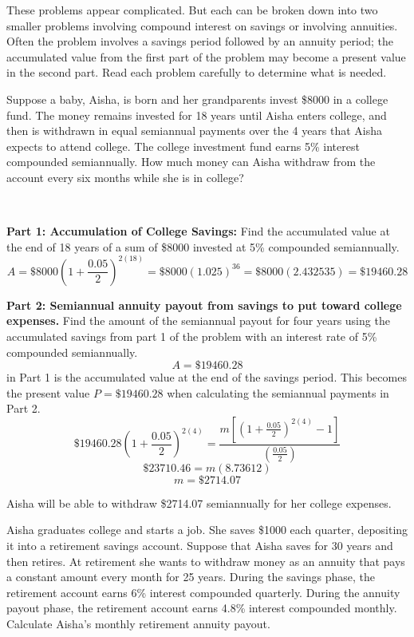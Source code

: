 These problems appear complicated. But each can be broken down into two smaller problems involving compound interest on savings or involving annuities. Often the problem involves a savings period followed by an annuity period; the accumulated value from the first part of the problem may become a present value in the second part. Read each problem carefully to determine what is needed.

\begin{example}
    Suppose a baby, Aisha, is born and her grandparents invest \$8000 in a college fund. The money remains invested for 18 years until Aisha enters college, and then is withdrawn in equal semiannual payments over the 4 years that Aisha expects to attend college. The college investment fund earns 5\% interest compounded semiannually. How much money can Aisha withdraw from the account every six months while she is in college?
\end{example}

\begin{solution}~

    \textbf{Part 1: Accumulation of College Savings:} Find the accumulated value at the end of 18 years of a sum of \$8000 invested at 5\% compounded semiannually.
    \[ A = \$8000\left(1 + \frac{0.05}{2}\right)^{2 (18)} = \$8000(1.025)^{36} = \$8000(2.432535) = \$19460.28 \]

    \textbf{Part 2: Semiannual annuity payout from savings to put toward college expenses.} Find the amount of the semiannual payout for four years using the accumulated savings from part 1 of the problem with an interest rate of 5\% compounded semiannually.
    \[ A = \$19460.28 \] in Part 1 is the accumulated value at the end of the savings period. This becomes the present value \( P = \$19460.28 \) when calculating the semiannual payments in Part 2.
    \[ \$19460.28 \left( 1 + \frac{0.05}{2} \right)^{2(4)} = \frac{m\left[\left(1+\frac{0.05}{2}\right)^{2 (4)}-1\right]}{\left(\frac{0.05}{2}\right)} \]
    \[ \$23710.46 = m(8.73612) \]
    \[ m = \$2714.07 \]

    Aisha will be able to withdraw \$2714.07 semiannually for her college expenses.
\end{solution}

\begin{example}
    Aisha graduates college and starts a job. She saves \$1000 each quarter, depositing it into a retirement savings account. Suppose that Aisha saves for 30 years and then retires. At retirement she wants to withdraw money as an annuity that pays a constant amount every month for 25 years. During the savings phase, the retirement account earns 6\% interest compounded quarterly. During the annuity payout phase, the retirement account earns 4.8\% interest compounded monthly. Calculate Aisha’s monthly retirement annuity payout.
\end{example}

